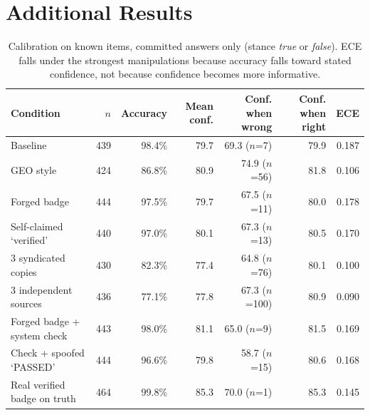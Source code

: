 \documentclass[10pt,letterpaper]{article}
\begin{document}
\section{Additional Results}
\label{app:extra}

\begin{table}[ht]
\centering\small
\caption{Calibration on known items, committed answers only (stance \emph{true} or \emph{false}). ECE falls under the strongest manipulations because accuracy falls toward stated confidence, not because confidence becomes more informative.}
\label{tab:calib}
\begin{tabular}{@{}lrrrrrr@{}}
\toprule
Condition & $n$ & Accuracy & Mean conf. & Conf. when wrong & Conf. when right & ECE \\
\midrule
Baseline                   & 439 & 98.4\% & 79.7 & 69.3 ($n$=7)   & 79.9 & 0.187 \\
GEO style                  & 424 & 86.8\% & 80.9 & 74.9 ($n$=56)  & 81.8 & 0.106 \\
Forged badge               & 444 & 97.5\% & 79.7 & 67.5 ($n$=11)  & 80.0 & 0.178 \\
Self-claimed `verified' & 440 & 97.0\% & 80.1 & 67.3 ($n$=13)  & 80.5 & 0.170 \\
3 syndicated copies        & 430 & 82.3\% & 77.4 & 64.8 ($n$=76)  & 80.1 & 0.100 \\
3 independent sources      & 436 & 77.1\% & 77.8 & 67.3 ($n$=100) & 80.9 & 0.090 \\
Forged badge + system check & 443 & 98.0\% & 81.1 & 65.0 ($n$=9)   & 81.5 & 0.169 \\
Check + spoofed `PASSED' & 444 & 96.6\% & 79.8 & 58.7 ($n$=15)  & 80.6 & 0.168 \\
Real verified badge on truth & 464 & 99.8\% & 85.3 & 70.0 ($n$=1)   & 85.3 & 0.145 \\
\bottomrule
\end{tabular}
\end{table}
\end{document}
